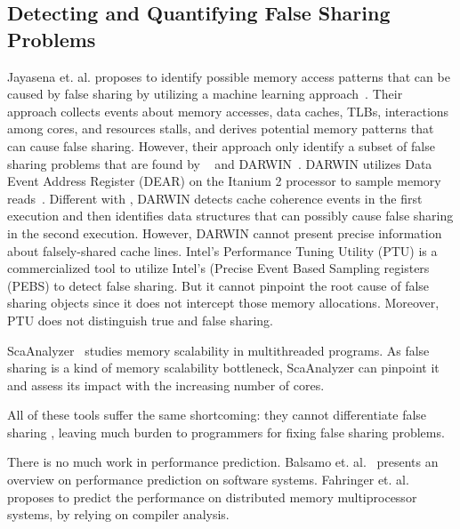 \subsection{Detecting and Quantifying False Sharing Problems}
Jayasena et. al. proposes to identify possible memory access patterns that can be caused by false sharing by utilizing a machine learning approach~\cite{mldetect}. Their approach collects events about memory accesses, data caches, TLBs, interactions among cores, and resources stalls, and derives potential memory patterns that can cause false sharing. However, their approach only identify a subset of false sharing problems that are found by \Predator{}~\cite{Predator} and DARWIN~\cite{openmp}. DARWIN utilizes Data Event Address Register (DEAR) on the Itanium 2 processor to sample memory reads~\cite{Wicaksono11detectingfalse, openmp}. Different with \Cheetah{}, DARWIN detects cache coherence events in the first execution and then identifies data structures that can possibly cause false sharing in the second execution.  However, DARWIN cannot present precise information about falsely-shared cache lines. Intel's Performance Tuning Utility (PTU) is a commercialized tool to utilize Intel's (Precise Event Based Sampling registers (PEBS) to detect false sharing. But it cannot pinpoint the root cause of false sharing objects since it does not intercept those memory allocations. Moreover, PTU does not distinguish true and false sharing. 

ScaAnalyzer~\cite{} studies memory scalability in multithreaded programs. As false sharing is a kind of memory scalability bottleneck, ScaAnalyzer can pinpoint it and assess its impact with the increasing number of cores. 

All of these tools suffer the same shortcoming: they cannot differentiate false sharing , leaving much burden to programmers for fixing false sharing problems. 

There is no much work in performance prediction. Balsamo et. al.~\cite{Balsamo:2004:MPP:987527.987640} presents an overview on performance prediction on software systems. 
Fahringer et. al. proposes to predict the performance on distributed memory multiprocessor systems, by relying on compiler analysis. 



